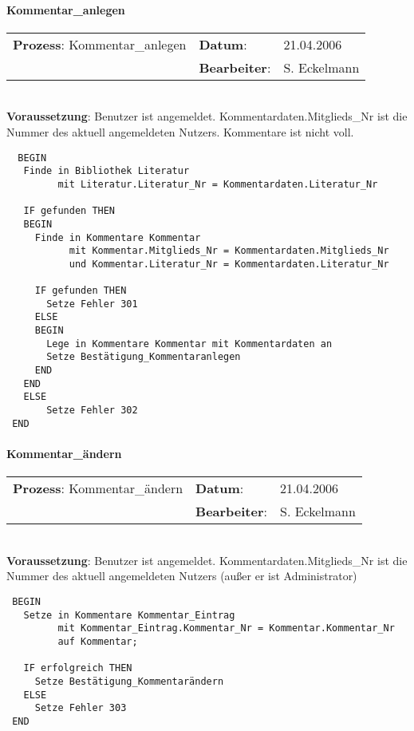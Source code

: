 \paragraph{Kommentar\_anlegen}
\begin{tabular}[t]{p{9.5cm}ll}
\textbf{Prozess}: Kommentar\_anlegen  	&\textbf{Datum}:      &21.04.2006\\
					&\textbf{Bearbeiter}: &S. Eckelmann\\
\end{tabular}

\hrulefill\\
\textbf{Voraussetzung}: Benutzer ist angemeldet. Kommentardaten.Mitglieds\_Nr ist die Nummer des aktuell angemeldeten Nutzers. Kommentare ist nicht voll.
\begin{verbatim}
  BEGIN
   Finde in Bibliothek Literatur
         mit Literatur.Literatur_Nr = Kommentardaten.Literatur_Nr
 
   IF gefunden THEN
   BEGIN
     Finde in Kommentare Kommentar
           mit Kommentar.Mitglieds_Nr = Kommentardaten.Mitglieds_Nr
           und Kommentar.Literatur_Nr = Kommentardaten.Literatur_Nr

     IF gefunden THEN
       Setze Fehler 301
     ELSE
     BEGIN
       Lege in Kommentare Kommentar mit Kommentardaten an
       Setze Bestätigung_Kommentaranlegen
     END
   END
   ELSE
       Setze Fehler 302
 END
\end{verbatim}
\hrulefill



\paragraph{Kommentar\_ändern}
\begin{tabular}[t]{p{9.5cm}ll}
\textbf{Prozess}: Kommentar\_ändern  	&\textbf{Datum}:      &21.04.2006\\
					&\textbf{Bearbeiter}: &S. Eckelmann\\
\end{tabular}

\hrulefill\\
\textbf{Voraussetzung}: Benutzer ist angemeldet. Kommentardaten.Mitglieds\_Nr ist die Nummer des aktuell angemeldeten Nutzers (außer er ist Administrator)
\begin{verbatim}
 BEGIN
   Setze in Kommentare Kommentar_Eintrag
         mit Kommentar_Eintrag.Kommentar_Nr = Kommentar.Kommentar_Nr
         auf Kommentar;
  
   IF erfolgreich THEN
     Setze Bestätigung_Kommentarändern
   ELSE
     Setze Fehler 303
 END
\end{verbatim}
\hrulefill



